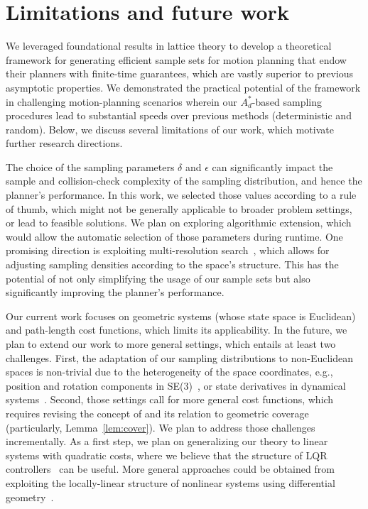 \section{Limitations and future work}\label{sec:future}
We leveraged foundational results in lattice theory to develop a theoretical framework for generating efficient sample sets for motion planning that endow their planners with finite-time guarantees, which are vastly superior to previous asymptotic properties. We demonstrated the practical potential of the framework in challenging motion-planning scenarios wherein our $A_d^*$-based sampling procedures lead to substantial speeds over previous methods (deterministic and random).
Below, we discuss several limitations of our work, which motivate further research directions.

 The choice of the sampling parameters $\delta$ and $\epsilon$ can significantly impact the sample and collision-check complexity of the sampling distribution, and hence the planner's performance. In this work, we selected those values according to a rule of thumb, which might not be generally applicable to broader problem settings, or lead to feasible solutions.  We plan on exploring algorithmic extension, which would allow the automatic selection of those parameters during runtime. One promising direction is exploiting multi-resolution search~\cite{saxena2022amra,FuSSA23}, which allows for adjusting sampling densities according to the space's structure. This has the potential of not only simplifying the usage of our sample sets but also significantly improving the planner's performance.  

 Our current work focuses on geometric systems (whose state space is Euclidean)  and path-length cost functions, which limits its applicability. In the future, we plan to extend our work to more general settings, which entails at least two challenges. First, the adaptation of our sampling distributions to non-Euclidean spaces is non-trivial due to the heterogeneity of the space coordinates, e.g., position and rotation components in SE(3)~\cite{yershova2004deterministic}, or state derivatives in dynamical systems~\cite{janson2018deterministic}. Second, those settings call for more general cost functions, which requires revising the concept of \decomps and its relation to geometric coverage (particularly, Lemma~\ref{lem:cover}). We plan to address those challenges incrementally. As a first step, we plan on generalizing our theory to linear systems with quadratic costs, where we believe that the structure of LQR controllers~\cite{liberzon2011calculus} can be useful. More general approaches could be obtained from exploiting the locally-linear structure of nonlinear systems using differential geometry~\cite{BulloLewis04}.

